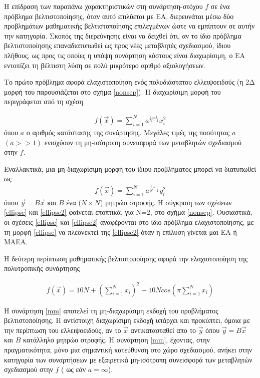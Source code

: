 Η επίδραση των παραπάνω χαρακτηριστικών στη συνάρτηση-στόχου $f$ σε ένα πρόβλημα βελτιστοποίησης, όταν αυτό επιλύεται με ΕΑ,  διερευνάται μέσω δύο προβλημάτων μαθηματικής βελτιστοποίησης επιλεγμένων ώστε να εμπίπτουν σε αυτήν την κατηγορία. Σκοπός της διερεύνησης είναι να δειχθεί ότι, αν το ίδιο πρόβλημα βελτιστοποίησης επαναδιατυπωθεί ως προς νέες μεταβλητές σχεδιασμού, ίδιου πλήθους, ως προς τις οποίες η υπόψη συνάρτηση κόστους είναι διαχωρίσιμη, ο ΕΑ εντοπίζει τη βέλτιστη λύση σε πολύ μικρότερο αριθμό αξιολογήσεων.  

Το πρώτο πρόβλημα αφορά ελαχιστοποίηση ενός πολυδιάστατου ελλειψοειδούς (η 2Δ μορφή του παρουσιάζεται στο σχήμα \ref{nonsep}). Η διαχωρίσιμη μορφή του περιγράφεται από τη σχέση   

\begin{eqnarray}
   f(\vec{x})=\sum^{N}_{i=1}a^{\frac{i-1}{N-1}}x_i^2
   \label{ellipse} 
\end{eqnarray}
όπου $a$ ο αριθμός κατάστασης της συνάρτησης. Μεγάλες τιμές της ποσότητας $a$ $(a>>1)$ ενισχύουν τη μη-ισότροπη συνεισφορά των μεταβλητών σχεδιασμού στην $f$.

Εναλλακτικά, μια μη-διαχωρίσιμη μορφή του ίδιου προβλήματος μπορεί να διατυπωθεί ως 
\begin{eqnarray}
   f(\vec{x})=\sum^{N}_{i=1}a^{\frac{i-1}{N-1}}y_i^2
   \label{ellipse2} 
\end{eqnarray}
όπου $\vec{y}=B\vec{x}$ και $B$ ένα ($N\times N$) μητρώο στροφής. Η σύγκριση των σχέσεων \ref{ellipse} και \ref{ellipse2} φαίνεται εποπτικά, για Ν=2, στο σχήμα \ref{nonsep}. Ουσιαστικά, οι σχέσεις \ref{ellipse} και \ref{ellipse2} αναφέρονται στο ίδιο πρόβλημα ελαχιστοποίησης, με τη μορφή \ref{ellipse} να πλεονεκτεί της \ref{ellipse2} όταν η επίλυση γίνεται μαι ΕΑ ή ΜΑΕΑ.  

Η δεύτερη περίπτωση μαθηματικής βελτιστοποίησης αφορά την ελαχιστοποίηση της πολυτροπικής συνάρτησης 

\begin{eqnarray}
   f(\vec{x})=10N+(\sum^{N}_{i=1}x_i)^2 - 10Ncos(\pi  \sum^{N}_{i=1}x_i)
   \label{mm} 
\end{eqnarray}

Η συνάρτηση \ref{mm} αποτελεί τη μη-διαχωρίσιμη εκδοχή του προβλήματος βελτιστοποίησης. Η αντίστοιχη διαχωρίσιμη εκδοχή υπάρχει και προκύπτει, όμοια με την περίπτωση του ελλειψοειδούς, αν το $\vec{x}$ αντικατασταθεί απο το $\vec{y}$ όπου $\vec{y}=B\vec{x}$ και $B$ κατάλληλο μητρώο στροφής. Η συνάρτηση \ref{mm}, έχοντας, στην πραγματικότητα, μόνο μια σημαντική κατεύθυνση στο χώρο σχεδιασμού, ανήκει στην κατηγορία των συναρτήσεων με εξαιρετικά μη-ισότροπη συνεισφορά των μεταβλητών σχεδιασμού στην $f$ ( ως εάν $a=\infty$). 

